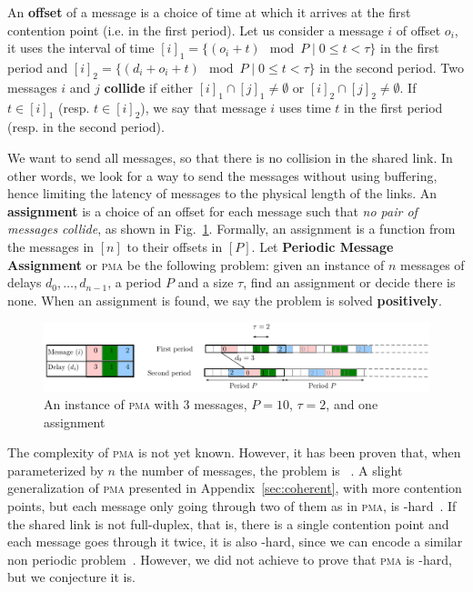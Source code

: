 \documentclass[a4paper,UKenglish,cleveref, autoref, thm-restate]{lipics-v2019}
\newcommand\pma{\textsc{pma}\xspace}
\begin{document}
An \textbf{offset} of a message is a choice of time at which it arrives
at the first contention point (i.e. in the first period). Let us consider a message $i$
of offset $o_i$, it uses the interval of time $[i]_1 = \{ (o_i + t) \mod P \mid 0 \leq t < \tau \}$ in the first period and $[i]_2 = \{ (d_i + o_i + t) \mod P \mid 0 \leq t < \tau \}$ in the second period. Two messages $i$ and $j$ \textbf{collide} if either $[i]_1 \cap [j]_1 \neq \emptyset $ or $[i]_2 \cap [j]_2 \neq \emptyset $. If $t \in [i]_1$ (resp. $t \in [i]_2$), we say that message $i$ uses time $t$ in the first period (resp. in the second period).

We want to send all messages, so that there is no collision in the shared link.
In other words, we look for a way to send the messages without using buffering,
hence limiting the latency of messages to the physical length of the links. An \textbf{assignment} is a choice of an offset for each message such that \emph{no pair of messages collide}, as shown in Fig.~\ref{fig:assignment}.
Formally, an assignment is a function from the messages in $[n]$ to their offsets in $[P]$.  
Let \textbf{Periodic Message Assignment} or \pma be the following problem: given an instance of $n$ messages of delays $d_0,\dots,d_{n-1}$, a period $P$ and a size $\tau$, find an assignment or decide there is none. When an assignment is found, we say the problem is solved \textbf{positively}.

\begin{figure}
\begin{center}
\includegraphics[scale=0.7]{instance}
\end{center}
\caption{An instance of \pma with $3$ messages, $P= 10$, $\tau = 2$, and one assignment}
\label{fig:assignment}
\end{figure}

The complexity of \pma is not yet known. However, it has been proven that, when parameterized by
$n$ the number of messages, the problem is \FPT~\cite{barth2018deterministic}. A slight generalization of \pma presented in Appendix~\ref{sec:coherent}, with more contention points, but each message only going through two of them as in \pma, is \NP-hard~\cite{barth2018deterministic}. If the shared link is not full-duplex, that is, there is a single contention point and each message goes through it twice, it is also \NP-hard, since we can encode a similar non periodic problem~\cite{orman1997complexity}. However, we did not achieve to prove that \pma is \NP-hard, but we conjecture it is.
	
\end{document}
